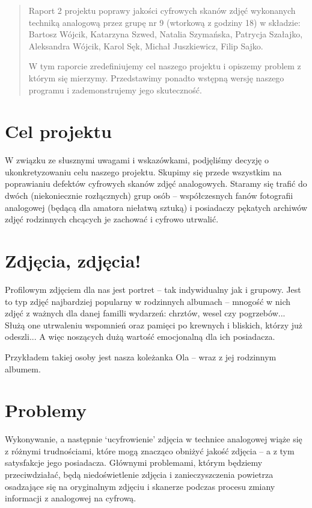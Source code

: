 \documentclass[]{mwart}
\begin{document}
\vfill
\begin{abstract}
    Raport 2 projektu poprawy jakości cyfrowych skanów zdjęć wykonanych techniką analogową przez grupę nr 9 (wtorkową z godziny 18)
    w składzie:  Bartosz Wójcik, Katarzyna Szwed, Natalia Szymańska,
    Patrycja Szałajko, Aleksandra Wójcik, Karol Sęk, Michał Juszkiewicz, Filip Sajko.

    W tym raporcie zredefiniujemy cel naszego projektu i opiszemy problem z którym się mierzymy.
    Przedstawimy ponadto wstępną wersję naszego programu i zademonstrujemy jego skuteczność.
\end{abstract}

\newpage
\tableofcontents{}

\newpage

\section{Cel projektu}
W związku ze słusznymi uwagami i wskazówkami, podjęliśmy decyzję o ukonkretyzowaniu celu naszego projektu.
Skupimy się przede wszystkim na poprawianiu defektów cyfrowych skanów zdjęć analogowych.
Staramy się trafić do dwóch (niekoniecznie rozłącznych) grup osób --
współczesnych fanów fotografii analogowej (będącą dla amatora niełatwą sztuką) i posiadaczy pękatych
archiwów zdjęć rodzinnych chcących je zachować i cyfrowo utrwalić.

\section{Zdjęcia, zdjęcia!}
Profilowym zdjęciem dla nas jest portret -- tak indywidualny jak i grupowy.
Jest to typ zdjęć najbardziej popularny w rodzinnych albumach -- mnogość w nich zdjęć z ważnych
dla danej familli wydarzeń: chrztów, wesel czy pogrzebów... Służą one utrwaleniu wspomnień oraz pamięci
po krewnych i bliskich, którzy już odeszli... A więc noszących dużą wartość emocjonalną dla ich posiadacza.

Przykładem takiej osoby jest nasza koleżanka Ola -- wraz z jej rodzinnym albumem.

\section{Problemy}
Wykonywanie, a następnie `ucyfrowienie' zdjęcia w technice analogowej wiąże się z różnymi trudnościami,
które mogą znacząco obniżyć jakość zdjęcia -- a z tym satysfakcje jego posiadacza. Głównymi problemami,
którym będziemy przeciwdziałać, będą niedoświetlenie zdjęcia i zanieczyszczenia powietrza osadzające
się na oryginalnym zdjęciu i skanerze podczas procesu zmiany informacji z analogowej na cyfrową.
\end{document}
